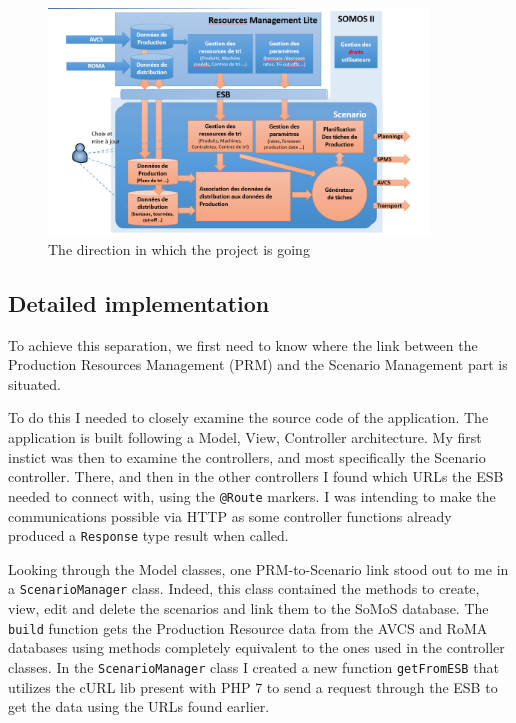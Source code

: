 \documentclass[12pt,a4paper,twoside]{article}
\begin{document}
\begin{figure}[H]
\centering
\includegraphics[width=0.9\textwidth]{SOMOS_END2.PNG}
\caption{\label{somos end}The direction in which the project is going}
\end{figure}
\subsection{Detailed implementation}
To achieve this separation, we first need to know where the link between the Production Resources Management (PRM) and the Scenario Management part is situated.

To do this I needed to closely examine the source code of the application. The application is built following a Model, View, Controller architecture. My first instict was then to examine the controllers, and most specifically the Scenario controller. There, and then in the other controllers I found which URLs the ESB needed to connect with, using the \texttt{@Route} markers. I was intending to make the communications possible via HTTP as some controller functions already produced a \texttt{Response} type result when called.

Looking through the Model classes, one PRM-to-Scenario link stood out to me in a \texttt{ScenarioManager} class. Indeed, this class contained the methods to create, view, edit and delete the scenarios and link them to the SoMoS database. The \texttt{build} function gets the Production Resource data from the AVCS and RoMA databases using methods completely equivalent to the ones used in the controller classes. In the \texttt{ScenarioManager} class I created a new function \texttt{getFromESB} that utilizes the cURL lib present with PHP 7 to send a request through the ESB to get the data using the URLs found earlier.
\end{document}
